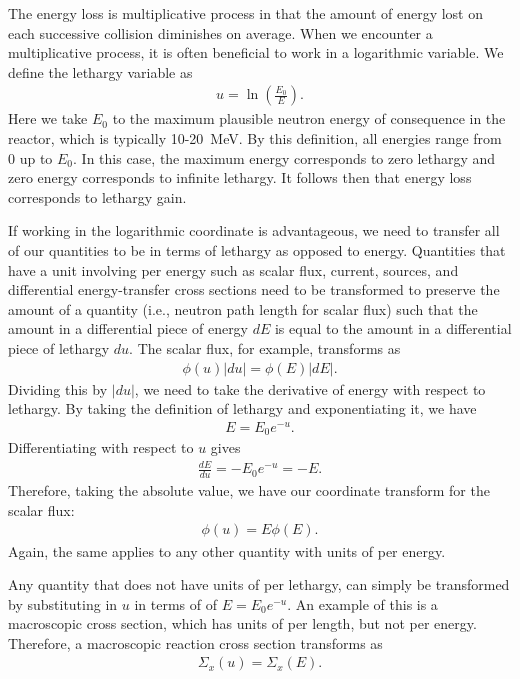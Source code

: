 The energy loss is multiplicative process in that the amount of energy lost on each successive collision diminishes on average. When we encounter a multiplicative process, it is often beneficial to work in a logarithmic variable. We define the lethargy variable as
\begin{align}
  u = \ln\left( \frac{E_0}{E} \right) .
\end{align}
Here we take $E_0$ to the maximum plausible neutron energy of consequence in the reactor, which is typically 10-20~MeV. By this definition, all energies range from 0 up to $E_0$. In this case, the maximum energy corresponds to zero lethargy and zero energy corresponds to infinite lethargy. It follows then that energy loss corresponds to lethargy gain.

If working in the logarithmic coordinate is advantageous, we need to transfer all of our quantities to be in terms of lethargy as opposed to energy. Quantities that have a unit involving per energy such as scalar flux, current, sources, and differential energy-transfer cross sections need to be transformed to preserve the amount of a quantity (i.e., neutron path length for scalar flux) such that the amount in a differential piece of energy $dE$ is equal to the amount in a differential piece of lethargy $du$. The scalar flux, for example, transforms as
\begin{align}
  \phi(u) |du| = \phi(E) | dE | .
\end{align}
Dividing this by $|du|$, we need to take the derivative of energy with respect to lethargy. By taking the definition of lethargy and exponentiating it, we have
\begin{align}
  E = E_0 e^{-u} .
\end{align}
Differentiating with respect to $u$ gives
\begin{align}
  \frac{dE}{du} = -E_0 e^{-u} = -E .
\end{align}
Therefore, taking the absolute value, we have our coordinate transform for the scalar flux:
\begin{align}
  \phi(u) = E \phi(E) .
\end{align}
Again, the same applies to any other quantity with units of per energy.

Any quantity that does not have units of per lethargy, can simply be transformed by substituting in $u$ in terms of of $E = E_0 e^{-u}$. An example of this is a macroscopic cross section, which has units of per length, but not per energy. Therefore, a macroscopic reaction cross section transforms as
\begin{align}
  \Sigma_x(u) = \Sigma_x(E) .
\end{align} 

